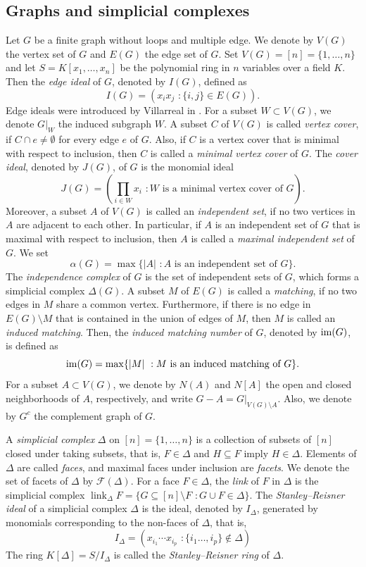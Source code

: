 \documentclass[12pt]{amsart}
\theoremstyle{definition}
\theoremstyle{remark}
\DeclareMathOperator{\link}{link}
\begin{document}
\subsection{Graphs and simplicial complexes}
Let $G$ be a finite graph without loops and multiple edge. We denote by $V(G)$ the vertex set of $G$ and $E(G)$ the edge set of $G$. Set $V(G)=[n]=\{1,\ldots, n\}$ and let $S=K[x_{1},\dots,x_{n}]$ be the polynomial ring in $n$ variables over a field $K$. Then the {\it edge ideal} of $G$, denoted by $I(G)$, defined as 
$$I(G)=(x_{i}x_{j}\,\,:\{i,j\}\in E(G)).$$
Edge ideals were introduced by Villarreal in \cite{v1990}. For a subset $W\subset V(G)$, we denote $G|_{W}$ the induced subgraph $W$. A subset $C$ of $V(G)$ is called {\it vertex cover}, if $C\cap e\neq\emptyset$ for every edge $e$ of $G$. Also, if $C$ is a vertex cover that is minimal with respect to inclusion, then $C$ is called a {\it minimal vertex cover} of $G$. The \textit{cover ideal}, denoted by $J(G)$, of $G$ is the monomial ideal $$J(G)=(\prod_{i\in W}x_{i}\,\,: W \mbox{ is a minimal vertex cover of } G).$$ 
Moreover, a subset $A$ of $V(G)$ is called an {\it independent set}, if no two vertices in $A$ are adjacent to each other. In particular, if $A$ is an independent set of $G$ that is maximal with respect to inclusion, then $A$ is called a {\it maximal independent set} of $G$. We set $$\alpha(G)=\max\{|A|\,\,: A\mbox{ is an independent set of }G\}.$$
The {\it independence complex} of $G$ is the set of independent sets of $G$, which forms a simplicial complex $\Delta(G)$. A subset $M$ of $E(G)$ is called a {\it matching}, if no two edges in $M$ share a common vertex. Furthermore, if there is no edge in $E(G)\setminus M$ that is contained in the union of edges of $M$, then $M$ is called an {\it induced matching}. Then, the {\it induced matching number} of $G$, denoted by ${\rm im}(G)$, is defined as $${\rm im}(G)=\max\{|M|\,\,: M\mbox{ is an induced matching of }G\}.$$
For a subset $A\subset V(G)$, we denote by $N(A)$ and $N[A]$ the open and closed neighborhoods of $A$, respectively, and write $G-A=G|_{V(G)\setminus A}$. Also, we denote by $G^{c}$ the complement graph of $G$. 

A \emph{simplicial complex} $\Delta$ on $[n]=\{1,\ldots,n\}$ is a collection of subsets of $[n]$ closed under taking subsets, that is, $F\in\Delta$ and $H\subseteq F$ imply $H\in \Delta$. Elements of $\Delta$ are called {\it faces}, and maximal faces under inclusion are {\it facets}. We denote the set of facets of $\Delta$ by $\mathcal{F}(\Delta)$. For a face $F \in \Delta$, the {\it link} of $F$ in $\Delta$ is the simplicial complex $\link_{\Delta}F=\{G\subseteq[n]\setminus F\,\,:G\cup F\in\Delta\}$. The {\it Stanley--Reisner ideal} of a simplicial complex $\Delta$ is the ideal, denoted by $I_{\Delta}$, generated by monomials corresponding to the non-faces of $\Delta$, that is, 
$$I_{\Delta}=(x_{i_{1}}\cdots x_{i_{p}}\,\,:\{i_{1}\dots,i_{p}\}\notin\Delta)$$
The ring $K[\Delta]=S/I_\Delta$ is called the {\it Stanley–Reisner ring} of $\Delta$. 
\end{document}
